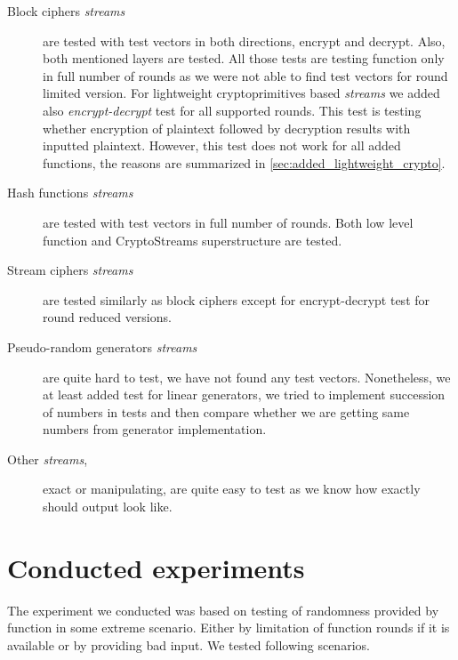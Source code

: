 \documentclass[
    digital,    %
    oneside,    %
    color,
    11pt,
    nocover,
    notable,
    nolof,
    nolot,
    final
]{fithesis3}
\begin{document}
\begin{description}
	\item[Block ciphers \textit{streams}] are tested with test vectors in both directions, encrypt and decrypt. Also, both mentioned layers are tested. All those tests are testing function only in full number of rounds as we were not able to find test vectors for round limited version. For lightweight cryptoprimitives based \textit{streams} we added also \textit{encrypt-decrypt} test for all supported rounds. This test is testing whether encryption of plaintext followed by decryption results with inputted plaintext. However, this test does not work for all added functions, the reasons are summarized in \cref{sec:added_lightweight_crypto}.
	
	\item[Hash functions \textit{streams}] are tested with test vectors in full number of rounds. Both low level function and CryptoStreams superstructure are tested.
	
	\item[Stream ciphers \textit{streams}] are tested similarly as block ciphers except for encrypt-decrypt test for round reduced versions.
	
	\item[Pseudo-random generators \textit{streams}] are quite hard to test, we have not found any test vectors. Nonetheless, we at least added test for linear generators, we tried to implement succession of numbers in tests and then compare whether we are getting same numbers from generator implementation. 
	
	\item[Other \textit{streams},] exact or manipulating, are quite easy to test as we know how exactly should output look like.
	 
\end{description}


\section{Conducted experiments}

The experiment we conducted was based on testing of randomness provided by function in some extreme scenario. Either by limitation of function rounds if it is available or by providing bad input. We tested following scenarios.
\end{document}
